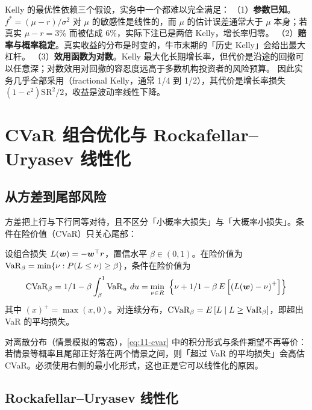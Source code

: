 \begin{warningbox}
Kelly 的最优性依赖三个假设，实务中一个都难以完全满足：
（1）\textbf{参数已知}。$f^{*} = (\mu - r)/\sigma^{2}$ 对 $\mu$ 的敏感性是线性的，而 $\mu$ 的估计误差通常大于 $\mu$ 本身；若真实 $\mu - r = 3\%$ 而被估成 $6\%$，实际下注已是两倍 Kelly，增长率归零。
（2）\textbf{赔率与概率稳定}。真实收益的分布是时变的，牛市末期的「历史 Kelly」会给出最大杠杆。
（3）\textbf{效用函数为对数}。Kelly 最大化长期增长率，但代价是沿途的回撤可以任意深；对数效用对回撤的容忍度远高于多数机构投资者的风险预算。
因此实务几乎全部采用（fractional Kelly，通常 1/4 到 1/2），其代价是增长率损失 $\left(1-c^{2}\right)\text{SR}^{2}/2$，收益是波动率线性下降。
\end{warningbox}

\section{CVaR 组合优化与 Rockafellar--Uryasev 线性化}

\subsection{从方差到尾部风险}

方差把上行与下行同等对待，且不区分「小概率大损失」与「大概率小损失」。条件在险价值（CVaR）只关心尾部：

\begin{definition}\label{def:11-cvar}
设组合损失 $L(\bm{w}) = -\bm{w}^{\top}r$，置信水平 $\beta \in (0,1)$。在险价值为 $\operatorname{VaR}_\beta = \min\{\nu: P(L \le \nu) \ge \beta\}$，条件在险价值为
\begin{equation}\label{eq:11-cvar}
  \operatorname{CVaR}_\beta = 1/1-\beta\int_{\beta}^{1}\operatorname{VaR}_u\,d u
  = \min_{\nu\in R}\ \left\{\nu + 1/1-\beta\,E\left[\left(L(\bm{w})-\nu\right)^{+}\right]\right\}
\end{equation}
其中 $(x)^{+} = \max(x,0)$。对连续分布，$\operatorname{CVaR}_\beta = E\left[L \mid L \ge \operatorname{VaR}_\beta\right]$，即超出 VaR 的平均损失。
\end{definition}

对离散分布（情景模拟的常态），\cref{eq:11-cvar} 中的积分形式与条件期望不再等价：若情景等概率且尾部正好落在两个情景之间，则「超过 VaR 的平均损失」会高估 CVaR。必须使用右侧的最小化形式，这也正是它可以线性化的原因。

\subsection{Rockafellar--Uryasev 线性化}

